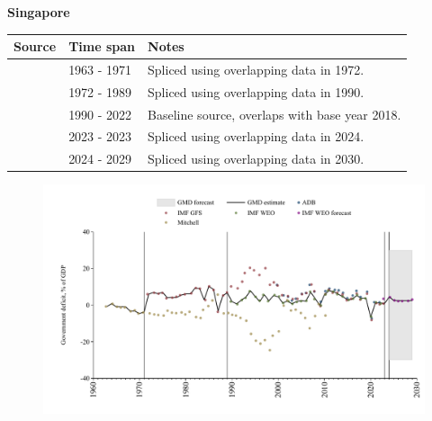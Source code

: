\documentclass[12pt,a4paper,landscape]{article}
\begin{document}
\begin{adjustbox}{max totalsize={\paperwidth}{\paperheight},center}
\begin{minipage}[t][\textheight][t]{\textwidth}
\vspace*{0.5cm}
{}
\begin{center}
{\Large\bfseries Singapore}
\end{center}
\vspace{0.5cm}
\begin{table}[H]
\centering
\small
\begin{tabular}{|l|l|l|}
\hline
\textbf{Source} & \textbf{Time span} & \textbf{Notes} \\
\hline
\rowcolor{white}\cite{Mitchell}& 1963 - 1971 &Spliced using overlapping data in 1972.\\
\rowcolor{lightgray}\cite{IMF_GFS}& 1972 - 1989 &Spliced using overlapping data in 1990.\\
\rowcolor{white}\cite{IMF_WEO}& 1990 - 2022 &Baseline source, overlaps with base year 2018.\\
\rowcolor{lightgray}\cite{IMF_GFS}& 2023 - 2023 &Spliced using overlapping data in 2024.\\
\rowcolor{white}\cite{IMF_WEO_forecast}& 2024 - 2029 &Spliced using overlapping data in 2030.\\
\hline
\end{tabular}
\end{table}
\begin{figure}[H]
\centering
\includegraphics[width=\textwidth,height=0.6\textheight,keepaspectratio]{graphs/SGP_govdef_GDP.pdf}
\end{figure}
\end{minipage}
\end{adjustbox}
\end{document}
